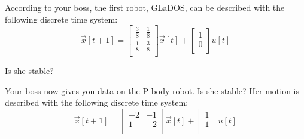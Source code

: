 \begin{enumerate}

\qitem According to your boss, the first robot, GLaDOS, can be described with the following discrete time system:
\begin{equation*}
    \vec{x}[t+1] =
    \begin{bmatrix}
    \frac{3}{8} & \frac{1}{8}\\
    \frac{1}{8} & \frac{3}{8}\\
    \end{bmatrix}
    \vec{x}[t] +
    \begin{bmatrix}
    1\\
    0\\
    \end{bmatrix}
    u[t]
\end{equation*}

Is she stable?


\qitem Your boss now gives you data on the P-body robot. Is she stable?
Her motion is described with the following discrete time system:
\begin{equation*}
    \vec{x}[t + 1] =
    \begin{bmatrix}
    -2 & -1\\
    1 & -2\\
    \end{bmatrix}
    \vec{x}[t] +
    \begin{bmatrix}
    1\\
    1\\
    \end{bmatrix}
    u[t]
\end{equation*}


\end{enumerate}
